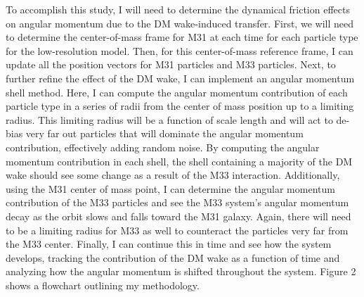 \documentclass[fleqn,usenatbib]{mnras}
\begin{document}
\vspace{10pt}

To accomplish this study, I will need to determine the dynamical friction effects on angular momentum due to the DM wake-induced transfer. First, we will need to determine the center-of-mass frame for M31 at each time for each particle type for the low-resolution model. Then, for this center-of-mass reference frame, I can update all the position vectors for M31 particles and M33 particles. Next, to further refine the effect of the DM wake, I can implement an angular momentum shell method. Here, I can compute the angular momentum contribution of each particle type in a series of radii from the center of mass position up to a limiting radius. This limiting radius will be a function of scale length and will act to de-bias very far out particles that will dominate the angular momentum contribution, effectively adding random noise. By computing the angular momentum contribution in each shell, the shell containing a majority of the DM wake should see some change as a result of the M33 interaction. Additionally, using the M31 center of mass point, I can determine the angular momentum contribution of the M33 particles and see the M33 system's angular momentum decay as the orbit slows and falls toward the M31 galaxy. Again, there will need to be a limiting radius for M33 as well to counteract the particles very far from the M33 center. Finally, I can continue this in time and see how the system develops, tracking the contribution of the DM wake as a function of time and analyzing how the angular momentum is shifted throughout the system. Figure 2 shows a flowchart outlining my methodology. 

\vspace{10pt}
\end{document}
